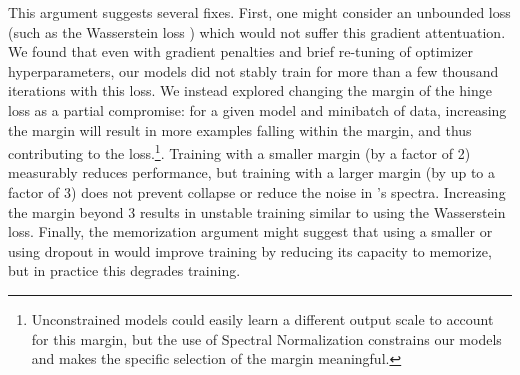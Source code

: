  
 
 

 
This argument suggests several fixes. First, one might consider an unbounded loss (such as the Wasserstein loss \citep{arjovsky2017wgan}) which would not suffer this gradient attentuation. We found that even with gradient penalties and brief re-tuning of optimizer hyperparameters, our models did not stably train for more than a few thousand iterations with this loss. We instead explored changing the margin of the hinge loss as a partial compromise: for a given model and minibatch of data, increasing the margin will result in more examples falling within the margin, and thus contributing to the loss.\footnote{Unconstrained models could easily learn a different output scale to account for this margin, but the use of Spectral Normalization constrains our models and makes the specific selection of the margin meaningful.}. Training with a smaller margin (by a factor of 2) measurably reduces performance, but training with a larger margin (by up to a factor of 3) does not prevent collapse or reduce the noise in \discr{}'s spectra. Increasing the margin beyond 3 results in unstable training similar to using the Wasserstein loss. Finally, the memorization argument might suggest that using a smaller \discr{} or using dropout in \discr{} would improve training by reducing its capacity to memorize, but in practice this degrades training.




